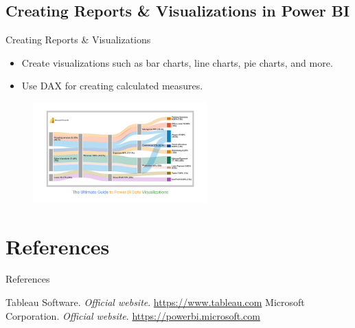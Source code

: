\documentclass[aspectratio=169, hideothersubsections]{beamer}
\begin{document}
\subsection{Creating Reports \& Visualizations in Power BI}
\begin{frame}{Creating Reports \& Visualizations}
  \begin{itemize}
    \item Create visualizations such as bar charts, line charts, pie charts, and more.
    \item Use DAX for creating calculated measures.
  \end{itemize}
\begin{figure}
  \centering
  \includegraphics[width=0.6\textwidth]{pb4.jpg}
  \label{fig:example}
\end{figure}
\end{frame}

\section{References}
\begin{frame}{References}
  \begin{thebibliography}{10}
    \beamertemplatebookbibitems
     Tableau Software. \textit{Official website}. \url{https://www.tableau.com}
    \beamertemplatebookbibitems
     Microsoft Corporation. \textit{Official website}. \url{https://powerbi.microsoft.com}
  \end{thebibliography}
\end{frame}
\end{document}
